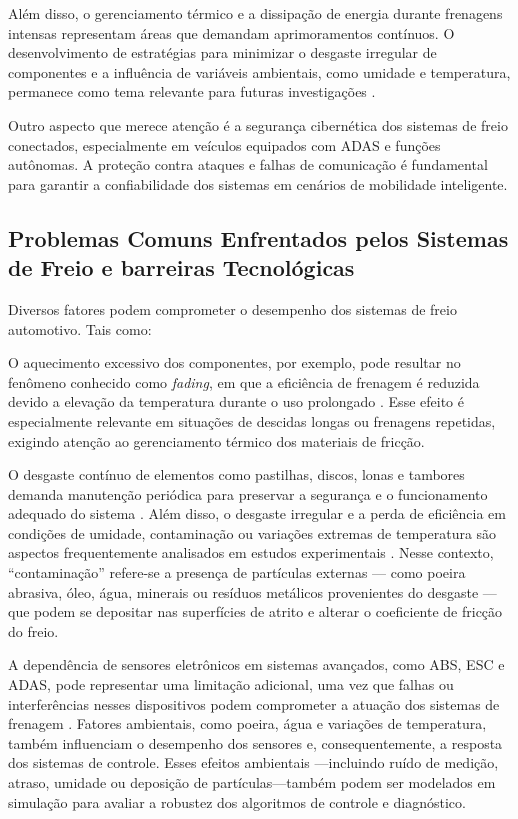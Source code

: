 Além disso, o gerenciamento térmico e a dissipação de energia durante frenagens intensas representam áreas que demandam aprimoramentos contínuos. O desenvolvimento de estratégias para minimizar o desgaste irregular de componentes e a influência de variáveis ambientais, como umidade e temperatura, permanece como tema relevante para futuras investigações \cite{Konrad2014, Rudolf2011}.

Outro aspecto que merece atenção é a segurança cibernética dos sistemas de freio conectados, especialmente em veículos equipados com ADAS e funções autônomas. A proteção contra ataques e falhas de comunicação é fundamental para garantir a confiabilidade dos sistemas em cenários de mobilidade inteligente.

\subsection{Problemas Comuns Enfrentados pelos Sistemas de Freio e barreiras Tecnológicas}
\label{sec:o-estado-da-arte-5-3}
Diversos fatores podem comprometer o desempenho dos sistemas de freio automotivo. Tais como:

O aquecimento excessivo dos componentes, por exemplo, pode resultar no fenômeno conhecido como \textit{fading}, em que a eficiência de frenagem é reduzida devido a elevação da temperatura durante o uso prolongado \cite{Konrad2014}. Esse efeito é especialmente relevante em situações de descidas longas ou frenagens repetidas, exigindo atenção ao gerenciamento térmico dos materiais de fricção.

O desgaste contínuo de elementos como pastilhas, discos, lonas e tambores demanda manutenção periódica para preservar a segurança e o funcionamento adequado do sistema \cite{Konrad2014, Lentin2022}. Além disso, o desgaste irregular e a perda de eficiência em condições de umidade, contaminação ou variações extremas de temperatura são aspectos frequentemente analisados em estudos experimentais \cite{Rudolf2011}. Nesse contexto, “contaminação” refere-se a presença de partículas externas — como poeira abrasiva, óleo, água, minerais ou resíduos metálicos provenientes do desgaste — que podem se depositar nas superfícies de atrito e alterar o coeficiente de fricção do freio.

A dependência de sensores eletrônicos em sistemas avançados, como ABS, ESC e ADAS, pode representar uma limitação adicional, uma vez que falhas ou interferências nesses dispositivos podem comprometer a atuação dos sistemas de frenagem \cite{Donghai2022}. Fatores ambientais, como poeira, água e variações de temperatura, também influenciam o desempenho dos sensores e, consequentemente, a resposta dos sistemas de controle. Esses efeitos ambientais —incluindo ruído de medição, atraso, umidade ou deposição de partículas—também podem ser modelados em simulação para avaliar a robustez dos algoritmos de controle e diagnóstico.

